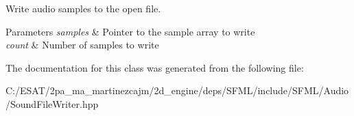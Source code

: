 Write audio samples to the open file. 


\begin{DoxyParams}{Parameters}
{\em samples} & Pointer to the sample array to write \\
\hline
{\em count} & Number of samples to write \\
\hline
\end{DoxyParams}


The documentation for this class was generated from the following file\+:\begin{DoxyCompactItemize}
\item 
C\+:/\+E\+S\+A\+T/2pa\+\_\+ma\+\_\+martinezcajm/2d\+\_\+engine/deps/\+S\+F\+M\+L/include/\+S\+F\+M\+L/\+Audio/Sound\+File\+Writer.\+hpp\end{DoxyCompactItemize}
